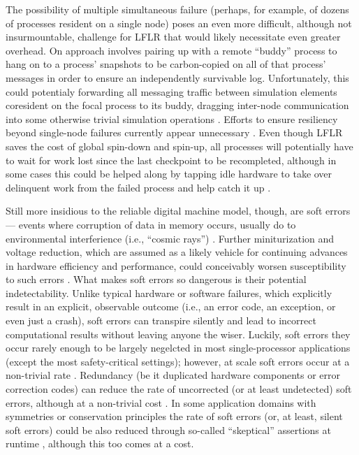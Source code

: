 The possibility of multiple simultaneous failure (perhaps, for example, of dozens of processes resident on a single node) poses an even more difficult, although not insurmountable, challenge for LFLR that would likely necessitate even greater overhead.
On approach involves pairing up with a remote ``buddy'' process to hang on to a process' snapshots to be carbon-copied on all of that process' messages in order to ensure an independently survivable log.
Unfortunately, this could potentialy forwarding all messaging traffic between simulation elements coresident on the focal process to its buddy, dragging inter-node communication into some otherwise trivial simulation operations \citep{chakravorty2007fault}.
Efforts to ensure resiliency beyond single-node failures currently appear unnecessary \citep[p. 12]{ni2016mitigation}.
Even though LFLR saves the cost of global spin-down and spin-up, all processes will potentially have to wait for work lost since the last checkpoint to be recompleted, although in some cases this could be helped along by tapping idle hardware to take over delinquent work from the failed process and help catch it up \citep{dongarra2014applied}.

Still more insidious to the reliable digital machine model, though, are soft errors --- events where corruption of data in memory occurs, usually do to environmental interferience (i.e., ``cosmic rays'') \citep{karnik2004characterization}.
Further miniturization and voltage reduction, which are assumed as a likely vehicle for continuing advances in hardware efficiency and performance, could conceivably  worsen susceptibility to such errors \citep{dongarra2014applied,kajmakovic2020challenges}.
What makes soft errors so dangerous is their potential indetectability.
Unlike typical hardware or software failures, which explicitly result in an explicit, observable outcome (i.e., an error code, an exception, or even just a crash), soft errors can transpire silently and lead to incorrect computational results without leaving anyone the wiser.
Luckily, soft errors they occur rarely enough to be largely negelcted in most single-processor applications (except the most safety-critical settings); however, at scale soft errors occur at a non-trivial rate
\citep{sridharan2015memory,scoles2018cosmic}.
Redundancy (be it duplicated hardware components or error correction codes) can reduce the rate of uncorrected (or at least undetected) soft errors, although at a non-trivial cost \citep{vankeirsbilck2015soft,sridharan2015memory}.
In some application domains with symmetries or conservation principles the rate of soft errors (or, at least, silent soft errors) could be also reduced through so-called ``skeptical'' assertions at runtime \citep{dongorra2014applied}, although this too comes at a cost.

